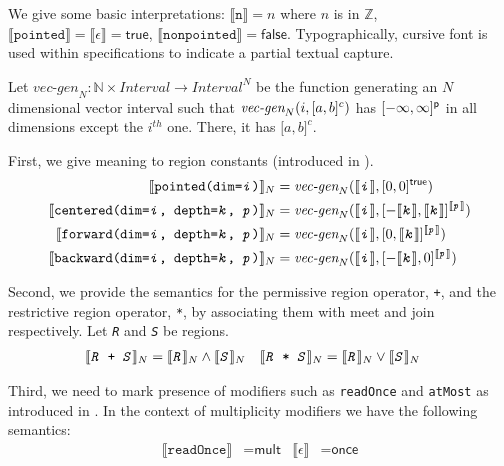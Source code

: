 \documentclass{article}
\theoremstyle{definition}
\theoremstyle{plain}
\newcommand{\interp}[1]{\llbracket#1\rrbracket}
\newcommand{\interv}[3]{\textnormal{$\lbrack#1,#2\rbrack^{#3}$}}
\newcommand{\vecgen}[3]{\textnormal{$\textit{vec-gen}_{#1}(#2,#3)$}}
\newcommand{\textcap}[1]{\texttt{\textit{#1}}}
\begin{document}
We give some basic interpretations: $\interp{\texttt{n}} = n$ where $n$ is in
$\mathbb{Z}$, $\interp{\texttt{pointed}} = \llbracket \epsilon \rrbracket =
\textsf{true}$, $\interp{\texttt{nonpointed}} = \textsf{false}$.
Typographically, cursive font is used within specifications to indicate a
partial textual capture.

Let $\textit{vec-gen}_N : \mathbb{N} \times \textit{Interval} \to
\textit{Interval}^N$ be the function generating an $N$ dimensional vector
interval such that \vecgen{N}{i}{\interv{a}{b}{c}} has
$\interv{-\infty}{\infty}{\textsf{p}}$ in all dimensions except the $i^{th}$
one. There, it has \interv{a}{b}{c}.

First, we give meaning to region constants (introduced in \Cref{}).
%
\begin{align*}
  \interp{\texttt{pointed(dim=\textcap{i})}}_N & =
    \vecgen{N}{\interp{\textcap{i}}}{\interv{0}{0}{\textsf{true}}}\\
%
  \interp{\texttt{centered(dim=\textcap{i}, depth=\textcap{k}, \textcap{p})}}_N
    & = \vecgen{N}
           {\interp{\textcap{i}}}
           {\interv{-\interp{\textcap{k}}}
                   {\interp{\textcap{k}}}
                   {\interp{\textcap{p}}}
           } \\
%
  \interp{\texttt{forward(dim=\textcap{i}, depth=\textcap{k}, \textcap{p})}}_N
    & = \vecgen{N}
           {\interp{\textcap{i}}}
           {\interv{0}
                   {\interp{\textcap{k}}}
                   {\interp{\textcap{p}}}
           } \\
%
  \interp{\texttt{backward(dim=\textcap{i}, depth=\textcap{k}, \textcap{p})}}_N
    & = \vecgen{N}
           {\interp{\textcap{i}}}
           {\interv{-\interp{\textcap{k}}}
                   {0}
                   {\interp{\textcap{p}}}
           }
\end{align*}

Second, we provide the semantics for the permissive region operator, \texttt{+},
and the restrictive region operator, \texttt{*}, by associating them with meet
and join respectively. Let \texttt{\textit{R}} and \texttt{\textit{S}} be
regions.
%
\begin{align*}
  \interp{\texttt{\textcap{R} + \textcap{S}}}_N & =
    \interp{\textcap{R}}_N \wedge \interp{\textcap{S}}_N
&
  \interp{\texttt{\textcap{R} * \textcap{S}}}_N & =
    \interp{\textcap{R}}_N \vee \interp{\textcap{S}}_N
\end{align*}

Third, we need to mark presence of modifiers such as \texttt{readOnce} and
\texttt{atMost} as introduced in \Cref{}. In the context of
multiplicity modifiers we have the following semantics:
%
\begin{align*}
  \interp{\texttt{readOnce}} & = \textsf{mult} &
  \llbracket\epsilon\rrbracket & = \textsf{once}
\end{align*}
\end{document}
